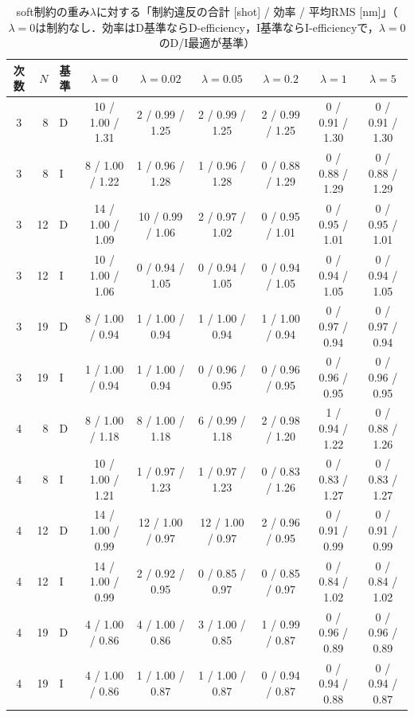 \documentclass[10.5pt,a4paper]{ltjsarticle}
\begin{document}
\begin{table}[htbp]
  \centering
  \caption{soft制約の重み$\lambda$に対する「制約違反の合計 [shot] / 効率 / 平均RMS [nm]」（$\lambda=0$は制約なし．効率はD基準ならD-efficiency，I基準ならI-efficiencyで，$\lambda=0$のD/I最適が基準）}
  \label{tab:soft}
  \scriptsize
  \setlength{\tabcolsep}{3pt}
\begin{tabular}{crlcccccc}
\toprule
次数 & $N$ & 基準 & $\lambda=0$ & $\lambda=0.02$ & $\lambda=0.05$ & $\lambda=0.2$ & $\lambda=1$ & $\lambda=5$ \\
\midrule
3 & 8 & D & 10 / 1.00 / 1.31 & 2 / 0.99 / 1.25 & 2 / 0.99 / 1.25 & 2 / 0.99 / 1.25 & 0 / 0.91 / 1.30 & 0 / 0.91 / 1.30 \\
3 & 8 & I & 8 / 1.00 / 1.22 & 1 / 0.96 / 1.28 & 1 / 0.96 / 1.28 & 0 / 0.88 / 1.29 & 0 / 0.88 / 1.29 & 0 / 0.88 / 1.29 \\
3 & 12 & D & 14 / 1.00 / 1.09 & 10 / 0.99 / 1.06 & 2 / 0.97 / 1.02 & 0 / 0.95 / 1.01 & 0 / 0.95 / 1.01 & 0 / 0.95 / 1.01 \\
3 & 12 & I & 10 / 1.00 / 1.06 & 0 / 0.94 / 1.05 & 0 / 0.94 / 1.05 & 0 / 0.94 / 1.05 & 0 / 0.94 / 1.05 & 0 / 0.94 / 1.05 \\
3 & 19 & D & 8 / 1.00 / 0.94 & 1 / 1.00 / 0.94 & 1 / 1.00 / 0.94 & 1 / 1.00 / 0.94 & 0 / 0.97 / 0.94 & 0 / 0.97 / 0.94 \\
3 & 19 & I & 1 / 1.00 / 0.94 & 1 / 1.00 / 0.94 & 0 / 0.96 / 0.95 & 0 / 0.96 / 0.95 & 0 / 0.96 / 0.95 & 0 / 0.96 / 0.95 \\
\midrule
4 & 8 & D & 8 / 1.00 / 1.18 & 8 / 1.00 / 1.18 & 6 / 0.99 / 1.18 & 2 / 0.98 / 1.20 & 1 / 0.94 / 1.22 & 0 / 0.88 / 1.26 \\
4 & 8 & I & 10 / 1.00 / 1.21 & 1 / 0.97 / 1.23 & 1 / 0.97 / 1.23 & 0 / 0.83 / 1.26 & 0 / 0.83 / 1.27 & 0 / 0.83 / 1.27 \\
4 & 12 & D & 14 / 1.00 / 0.99 & 12 / 1.00 / 0.97 & 12 / 1.00 / 0.97 & 2 / 0.96 / 0.95 & 0 / 0.91 / 0.99 & 0 / 0.91 / 0.99 \\
4 & 12 & I & 14 / 1.00 / 0.99 & 2 / 0.92 / 0.95 & 0 / 0.85 / 0.97 & 0 / 0.85 / 0.97 & 0 / 0.84 / 1.02 & 0 / 0.84 / 1.02 \\
4 & 19 & D & 4 / 1.00 / 0.86 & 4 / 1.00 / 0.86 & 3 / 1.00 / 0.85 & 1 / 0.99 / 0.87 & 0 / 0.96 / 0.89 & 0 / 0.96 / 0.89 \\
4 & 19 & I & 4 / 1.00 / 0.86 & 1 / 1.00 / 0.87 & 1 / 1.00 / 0.87 & 0 / 0.94 / 0.87 & 0 / 0.94 / 0.88 & 0 / 0.94 / 0.87 \\

\end{tabular}
\end{table}
\end{document}
